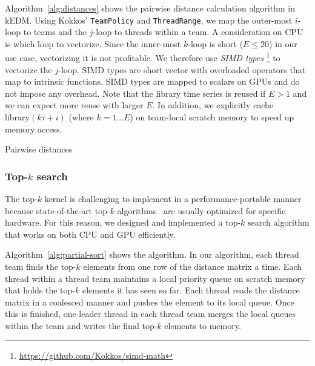\documentclass[sigconf]{acmart}
\begin{document}
Algorithm~\ref{alg:distances} shows the pairwise distance calculation
algorithm in kEDM\@. Using Kokkos' \texttt{TeamPolicy} and
\texttt{ThreadRange}, we map the outer-most $i$-loop to teams and the $j$-loop to
threads within a team. A consideration on CPU is which loop to vectorize.
Since the inner-most $k$-loop is short ($E \leq 20$) in our use case,
vectorizing it is not profitable. We therefore use \textit{SIMD types}
\footnote{\url{https://github.com/Kokkos/simd-math}} to vectorize the
$j$-loop. SIMD types are short vector with overloaded operators that map to
intrinsic functions. SIMD types are mapped to scalars on GPUs and do not
impose any overhead. Note that the library time series is reused if $E > 1$
and we can expect more reuse with larger $E$. In addition, we explicitly cache
$\mathrm{library} (k \tau + i)$ (where $k=1 \dots E$) on team-local scratch
memory to speed up memory access.

\begin{algorithm}
    \SetAlgoLined
    \DontPrintSemicolon
    \caption{Pairwise distances}%
    \label{alg:distances}
\end{algorithm}

\subsubsection{Top-$k$ search}

The top-$k$ kernel is challenging to implement in a performance-portable manner
because state-of-the-art top-$k$ algorithms~\cite{Johnson2019,Shanbhag2018}
are usually optimized for specific hardware. For this reason, we designed and
implemented a top-$k$ search algorithm that works on both CPU and GPU
efficiently.

Algorithm~\ref{alg:partial-sort} shows the algorithm. In our algorithm, each
thread team finds the top-$k$ elements from one row of the distance matrix a
time. Each thread within a thread team maintains a local priority queue on
scratch memory that holds the top-$k$ elements it has seen so far. Each thread
reads the distance matrix in a coalesced manner and pushes the element to its
local queue. Once this is finished, one leader thread in each thread team merges
the local queues within the team and writes the final top-$k$ elements to
memory.
\end{document}
